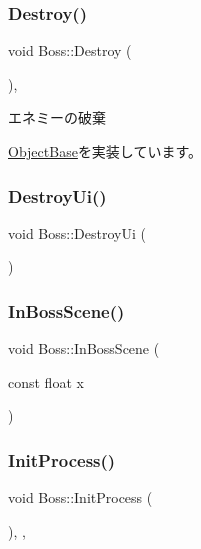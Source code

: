 \subsubsection{\texorpdfstring{Destroy()}{Destroy()}}
{\footnotesize\ttfamily void Boss\+::\+Destroy (\begin{DoxyParamCaption}{ }\end{DoxyParamCaption})\hspace{0.3cm}{\ttfamily [final]}, {\ttfamily [virtual]}}



エネミーの破棄 



\mbox{\hyperlink{class_object_base_a7fa4c548153c3af20f89673ffea809af}{Object\+Base}}を実装しています。

\mbox{\label{class_boss_af1d3f76c28bff11d80530e4c8fdca355}} 
\subsubsection{\texorpdfstring{Destroy\+Ui()}{DestroyUi()}}
{\footnotesize\ttfamily void Boss\+::\+Destroy\+Ui (\begin{DoxyParamCaption}{ }\end{DoxyParamCaption})\hspace{0.3cm}{\ttfamily [inline]}}

\mbox{\label{class_boss_adb8591a0e2a919380e560f05b51fa171}} 
\subsubsection{\texorpdfstring{In\+Boss\+Scene()}{InBossScene()}}
{\footnotesize\ttfamily void Boss\+::\+In\+Boss\+Scene (\begin{DoxyParamCaption}\item[{const float}]{x }\end{DoxyParamCaption})\hspace{0.3cm}{\ttfamily [inline]}}

\mbox{\label{class_boss_a460293079fd93f0ad2b98193fa367aa7}} 
\subsubsection{\texorpdfstring{Init\+Process()}{InitProcess()}}
{\footnotesize\ttfamily void Boss\+::\+Init\+Process (\begin{DoxyParamCaption}{ }\end{DoxyParamCaption})\hspace{0.3cm}{\ttfamily [final]}, {\ttfamily [protected]}, {\ttfamily [virtual]}}



